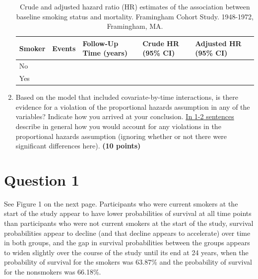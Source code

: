 \documentclass{article}\usepackage[]{graphicx}\usepackage[]{color}
\newif\ifdraft  %
\begin{document}
\begin{enumerate}
\begin{table}[H]
\centering
\parbox{13cm}{\caption{Crude and adjusted hazard ratio (HR) estimates of the association between baseline smoking status and mortality. Framingham Cohort Study. 1948-1972, Framingham, MA.}} 
\begin{tabular}{lllll}
  \hline
Smoker & Events & Follow-Up Time (years) & Crude HR (95\% CI) & Adjusted HR (95\% CI) \\ 
  \hline
No &  &  &  &  \\ 
  Yes &  &  &  &  \\ 
   \hline
\end{tabular}
\end{table}

  
  \item Based on the model that included covariate-by-time interactions, is there evidence for a violation of the proportional hazards assumption in any of the variables? Indicate how you arrived at your conclusion. \ul{In 1-2 sentences} describe in general how you would account for any violations in the proportional hazards assumption (ignoring whether or not there were significant differences here). \textbf{(10 points)}
\end{enumerate}

\pagebreak

\section*{Question 1}

\ifdraft

Using the Kaplan-Meier plots, graphically assess the relationship between baseline smoking status and time to death. \textbf{Briefly interpret what you see.} In 1-2 sentences describe the limitations of this approach. [{\ul{include the graph}}, labeled \textbf{Figure 1}] \textbf{(10 points)}

\fi



See Figure 1 on the next page.  Participants who were current smokers at the start of the study appear to have lower probabilities of survival at all time points than participants who were not current smokers at the start of the study, survival probabilities appear to decline (and that decline appears to accelerate) over time in both groups, and the gap in survival probabilities between the groups appears to widen slightly over the course of the study until its end at 24 years, when the probability of survival for the smokers was 63.87\% and the probability of survival for the nonsmokers was 66.18\%.
\end{document}
